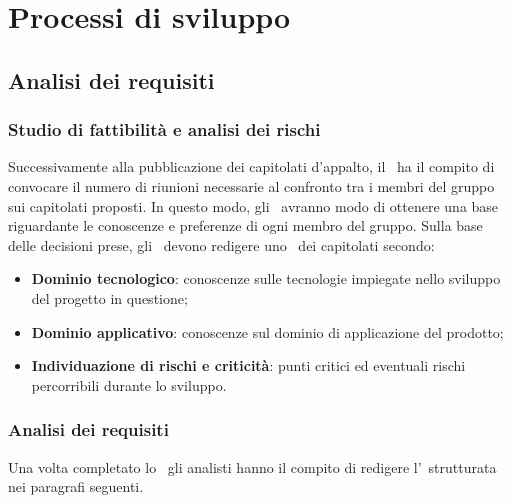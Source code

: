 \documentclass[../NormeDiProgetto.tex]{subfiles}
\begin{document}
	\section{Processi di sviluppo}
		\subsection{Analisi dei requisiti}
			\subsubsection{Studio di fattibilità e analisi dei rischi}
				Successivamente alla pubblicazione dei capitolati d'appalto, il
				\responsabilediprogetto\ ha il compito di convocare il numero
				di riunioni necessarie al confronto tra i membri del gruppo sui
				capitolati proposti. In questo modo, gli \analisti\ avranno modo
				di ottenere una base riguardante le conoscenze e preferenze di ogni
				membro del gruppo. Sulla base delle decisioni prese, gli
				\analisti\ devono redigere uno \studiodifattibilita\
				dei capitolati secondo:
				\begin{itemize}
					\item \textbf{Dominio tecnologico}: conoscenze sulle
					tecnologie impiegate nello sviluppo del progetto in questione;
					\item \textbf{Dominio applicativo}: conoscenze sul dominio di
					applicazione del prodotto;
					\item \textbf{Individuazione di rischi e criticità}: punti
					critici ed eventuali rischi percorribili durante lo sviluppo.
				\end{itemize}
			\subsubsection{Analisi dei requisiti}
				Una volta completato lo \studiodifattibilita\ gli analisti
				hanno il compito di redigere l'\analisideirequisiti\
				strutturata nei paragrafi seguenti.
\end{document}
